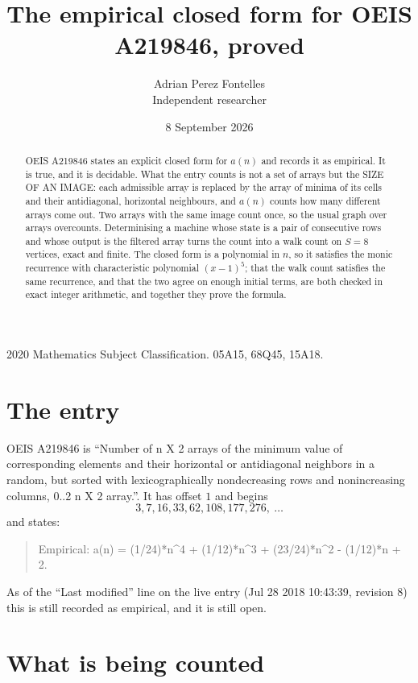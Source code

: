 \documentclass[11pt,a4paper]{article}
\title{The empirical closed form for OEIS A219846, proved}
\author{Adrian Perez Fontelles\\ \small Independent researcher}
\date{8 September 2026}
\theoremstyle{plain}
\theoremstyle{definition}
\begin{document}
\maketitle

\begin{abstract}
OEIS A219846 states an explicit closed form for $a(n)$ and records it as empirical. It is true, and
it is decidable. What the entry counts is not a set of arrays but the SIZE OF AN IMAGE: each
admissible array is replaced by the array of minima of its cells and their antidiagonal, horizontal neighbours,
and $a(n)$ counts how many different arrays come out. Two arrays with the same image count
once, so the usual graph over arrays overcounts. Determinising a machine whose state is a pair
of consecutive rows and whose output is the filtered array turns the count into a walk count on
$S=8$ vertices, exact and finite. The closed form is a polynomial in $n$, so it satisfies the
monic recurrence with characteristic polynomial $(x-1)^{5}$; that the walk count
satisfies the same recurrence, and that the two agree on enough initial terms, are both checked
in exact integer arithmetic, and together they prove the formula.
\end{abstract}

\noindent\small 2020 Mathematics Subject Classification. 05A15, 68Q45, 15A18.\normalsize

\section{The entry}

OEIS A219846 is ``Number of n X 2 arrays of the minimum value of corresponding elements and their horizontal or antidiagonal neighbors in a random, but sorted with lexicographically nondecreasing rows and nonincreasing columns, 0..2 n X 2 array.''. It has offset $1$ and begins
\[
3, 7, 16, 33, 62, 108, 177, 276,\ \dots
\]
and states:
\begin{quote}
Empirical: a(n) = (1/24)*n\^{}4 + (1/12)*n\^{}3 + (23/24)*n\^{}2 - (1/12)*n + 2.
\end{quote}
As of the ``Last modified'' line on the live entry (Jul 28 2018 10:43:39, revision 8)
this is still recorded as empirical, and it is still open.

\section{What is being counted}
\end{document}
